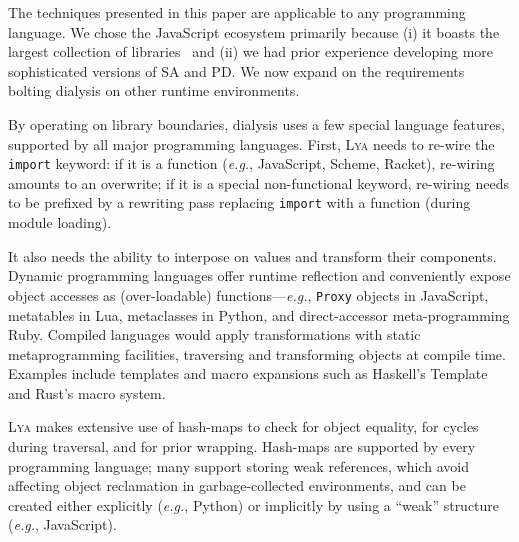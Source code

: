 \documentclass[letterpaper,twocolumn,10pt]{article}
\def\eg{{\em e.g.}, }
\newcommand{\ttt}[1]{\texttt{#1}}
\newcommand{\sys}{{\scshape Lya}\xspace}
\begin{document}
The techniques presented in this paper are applicable to any programming language.
We chose the JavaScript ecosystem %
primarily because
  (i) it boasts the largest collection of libraries~\cite{modulecounts} and
	(ii) we had prior experience developing more sophisticated versions of SA and PD.
We now expand on the requirements bolting dialysis on other runtime environments.

By operating on library boundaries, dialysis uses a few special language features, supported by all major programming languages.
First, \sys needs to re-wire the \ttt{import} keyword:
  if it is a function (\eg JavaScript, Scheme, Racket), re-wiring amounts to an overwrite;
  if it is a special non-functional keyword, re-wiring needs to be prefixed by a rewriting pass replacing \ttt{import} with a function (during module loading).

It also needs the ability to interpose on values and transform their components.
Dynamic programming languages offer runtime reflection and conveniently expose object accesses as (over-loadable) functions---\eg \ttt{Proxy} objects in JavaScript, metatables in Lua, metaclasses in Python, and direct-accessor meta-programming Ruby.
Compiled languages would apply transformations with static metaprogramming facilities, traversing and transforming objects at compile time.
Examples include templates and macro expansions such as Haskell's Template and Rust's macro system.

\sys makes extensive use of hash-maps to check for object equality, for cycles during traversal, and for prior wrapping.
Hash-maps are supported by every programming language; many support storing weak references, which avoid affecting object reclamation in garbage-collected environments, and can be created either explicitly (\eg Python) or implicitly by using a ``weak'' structure (\eg JavaScript).
\end{document}
